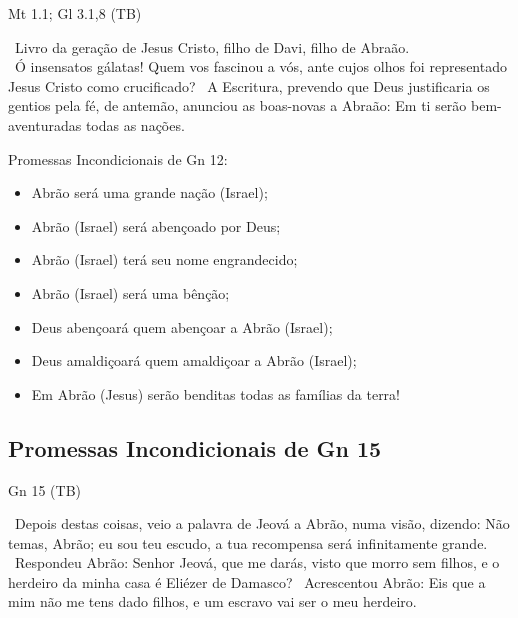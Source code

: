 \documentclass[12pt,aspectratio=169]{beamer}
\newcommand{\ver}[1]{%
    \raisebox{0.50ex}{%
        \scalebox{1.1}{%
            \pmb{\textbf{\textcolor{BSpbg}{#1}}}%
        }%
    }%
}
\newcommand{\QUOTE}[1]{%
    \par\noindent\hspace*{0.05\linewidth}%
    \begin{minipage}{0.9\linewidth}%
        \linespread{1.35}\large{#1}%
    \end{minipage}%
}
\newcommand{\RED}[1]{{\textcolor{TXred}{#1}}}
\newcommand{\YEL}[1]{{\textcolor{TXyel}{#1}}}
\newcommand{\GRE}[1]{{\textcolor{TXgre}{#1}}}
\newcommand{\MAG}[1]{{\textcolor{TXmag}{#1}}}
\newcommand{\BRI}[1]{{\textcolor{BSpbg}{#1}}}   %
\begin{document}
    \begin{frame}{Mt 1.1; Gl 3.1,8 (TB)}
        \QUOTE{%
            \ver{Mt 1.1}~Livro da geração de \MAG{Jesus Cristo}, filho de Davi, \YEL{filho de
            Abraão}.
            \\[\medskipamount]
            \ver{Gl 3.1}~Ó insensatos gálatas! Quem vos fascinou a vós, ante cujos olhos foi
            representado \MAG{Jesus Cristo} como crucificado?
            \ver{Gl 3.8}~A \YEL{Escritura}, \YEL{prevendo} que Deus justificaria os gentios pela
            fé, \YEL{de antemão, anunciou} as boas-novas a Abraão: \MAG{Em ti serão
            bem-aventuradas todas as nações}.
        }
    \end{frame}

    \begin{frame}{Promessas \YEL{Incondicionais} de \BRI{Gn 12}:}
        \begin{itemize}
            \item<1-> Abrão será uma \YEL{grande nação} (Israel);
            \item<1-> Abrão (Israel) será \YEL{abençoado por Deus};
            \item<1-> Abrão (Israel) terá seu \YEL{nome engrandecido};
            \item<1-> Abrão (Israel) será uma \YEL{bênção};
            \item<2-> Deus \GRE{abençoará quem abençoar} a Abrão (Israel);
            \item<2-> Deus \RED{amaldiçoará quem amaldiçoar} a Abrão (Israel);
            \item<2-> Em Abrão (Jesus) serão \MAG{benditas todas as famílias da terra}!
        \end{itemize}
    \end{frame}

    \subsection{Promessas \BRI{Incondicionais} de Gn 15}

    \begin{frame}{Gn 15 (TB)}
        \QUOTE{%
            \ver{1}~Depois destas coisas, veio a palavra de Jeová a Abrão, numa visão, dizendo:
            Não temas, Abrão; eu sou teu \YEL{escudo}, a tua \YEL{recompensa} será infinitamente
            grande.
            \ver{2}~Respondeu Abrão: Senhor Jeová, que me darás, visto que morro sem filhos, e o
            herdeiro da minha casa é Eliézer de Damasco?
            \ver{3}~Acrescentou Abrão: Eis que a mim não me tens dado filhos, e um escravo vai
            ser o meu herdeiro.
        }
    \end{frame}
\end{document}
